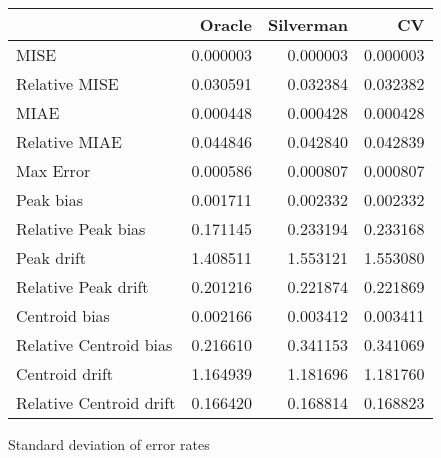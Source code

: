 \begin{tabular}{lrrr}
  \hline
 & Oracle & Silverman & CV \\ 
  \hline
MISE & 0.000003 & 0.000003 & 0.000003 \\ 
  Relative MISE & 0.030591 & 0.032384 & 0.032382 \\ 
  MIAE & 0.000448 & 0.000428 & 0.000428 \\ 
  Relative MIAE & 0.044846 & 0.042840 & 0.042839 \\ 
  Max Error & 0.000586 & 0.000807 & 0.000807 \\ 
  Peak bias & 0.001711 & 0.002332 & 0.002332 \\ 
  Relative Peak bias & 0.171145 & 0.233194 & 0.233168 \\ 
  Peak drift & 1.408511 & 1.553121 & 1.553080 \\ 
  Relative Peak drift & 0.201216 & 0.221874 & 0.221869 \\ 
  Centroid bias & 0.002166 & 0.003412 & 0.003411 \\ 
  Relative Centroid bias & 0.216610 & 0.341153 & 0.341069 \\ 
  Centroid drift & 1.164939 & 1.181696 & 1.181760 \\ 
  Relative Centroid drift & 0.166420 & 0.168814 & 0.168823 \\ 
   \hline
\end{tabular}
\caption{Standard deviation of error rates} 

